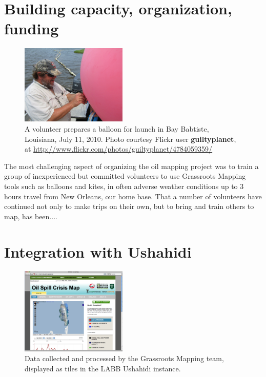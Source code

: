 \documentclass[11pt]{report}
\begin{document}
\section{Building capacity, organization, funding}

\begin{figure}
	\begin{flushright}
		\includegraphics[width=0.45\textwidth]{images/labb-bay-babtiste-trip.jpg}
		\caption{A volunteer prepares a balloon for launch in Bay Babtiste, Louisiana, July 11, 2010. Photo courtesy Flickr user \textbf{guiltyplanet}, at \url{http://www.flickr.com/photos/guiltyplanet/4784059359/}}
	\end{flushright}
\end{figure}

The most challenging aspect of organizing the oil mapping project was to train a group of inexperienced but committed volunteers to use Grassroots Mapping tools such as balloons and kites, in often adverse weather conditions up to 3 hours travel from New Orleans, our home base. That a number of volunteers have continued not only to make trips on their own, but to bring and train others to map, has been....

\section{Integration with Ushahidi}

\begin{figure}
	\begin{flushright}
		\includegraphics[width=0.45\textwidth]{images/labb-ushahidi.png}
		\caption{Data collected and processed by the Grassroots Mapping team, displayed as tiles in the LABB Ushahidi instance.}
	\end{flushright}
\end{figure}
\end{document}

